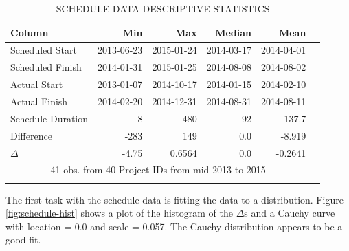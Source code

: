 \documentclass[SDSUThesis.tex]{subfiles}
\begin{document}
        \begin{longtable}{@{}l rr rrr}
            \toprule%
             \centering%
             {\bfseries Column}
             & {\bfseries Min}
             & {\bfseries Max}
             & {\bfseries Median}
             & {\bfseries Mean} \\
            
            \cmidrule[0.2pt](r{0.125em}){1-1}%
            \cmidrule[0.2pt](lr{0.125em}){2-2}%
            \cmidrule[0.2pt](l{0.125em}){3-3}%
            \cmidrule[0.2pt](l{0.125em}){4-4}%
            \cmidrule[0.2pt](l{0.125em}){5-5}%
            \endhead
            
            Scheduled Start & 2013-06-23 & 2015-01-24 & 2014-03-17 & 2014-04-01 \\
            \myrowcolour%
            Scheduled Finish & 2014-01-31 & 2015-01-25 & 2014-08-08 & 2014-08-02 \\
            Actual Start & 2013-01-07 & 2014-10-17 & 2014-01-15  & 2014-02-10 \\
            \myrowcolour%
            Actual Finish & 2014-02-20 & 2014-12-31 & 2014-08-31 & 2014-08-11 \\
            Schedule Duration & 8 & 480 & 92 & 137.7 \\
            \myrowcolour%
            Difference & -283 & 149 & 0.0 & -8.919 \\
            $\Delta$ & -4.75 & 0.6564 & 0.0 & -0.2641 \\
            
            \bottomrule
            
            \multicolumn{5}{c}{41 obs. from 40 Project IDs from mid 2013 to 2015} \\
            
            \caption{SCHEDULE DATA DESCRIPTIVE STATISTICS}
            \label{tab:schedule_desc}
        \end{longtable}
        
        The first task with the schedule data is fitting the data to 
        a distribution.  Figure \ref{fig:schedule-hist} shows
        a plot of the histogram of the $\Delta$s and a
        Cauchy curve with location = 0.0 and scale = 0.057.  The Cauchy
        distribution appears to be a good fit.  
        
\end{document}
